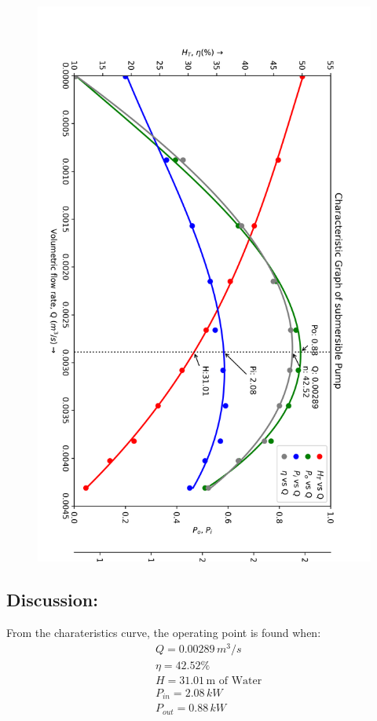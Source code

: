 \documentclass[12pt]{article}
\begin{document}
\pagebreak
\begin{figure}[h]
  \begin{center}
    \includegraphics*[width=0.8\linewidth]{img/exp_3a.png}
  \end{center}
\end{figure}

\pagebreak
\subsection*{Discussion:}
From the charateristics curve, the operating point is found when:
\begin{align*}
  & Q = 0.00289\, m^3/s \\
  &\eta = 42.52\% \\
  &H = 31.01\, \text{m of Water} \\
  &P_{in} = 2.08\, kW \\
  &P_{out} = 0.88\, kW
\end{align*}
\end{document}
